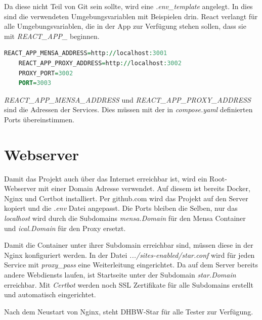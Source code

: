 Da diese nicht Teil von Git sein sollte, wird eine \emph{.env\_template} angelegt. In dies sind die verwendeten Umgebungsvariablen mit Beispielen drin.
React verlangt für alle Umgebungsvariablen, die in der App zur Verfügung stehen sollen, dass sie mit \emph{REACT\_APP\_} beginnen.

\begin{lstlisting}[language=vhdl,
	frame=single,           % Ein Rahmen um den Code
	framexleftmargin=15pt,  % Rahmen link von den Zahlen
	style=algoBericht,
	label={Dockerfile},
	captionpos=b           % Caption unter den Code setzen
	caption={.env für DHBW-Star}]
	REACT_APP_MENSA_ADDRESS=http://localhost:3001 
	REACT_APP_PROXY_ADDRESS=http://localhost:3002
	PROXY_PORT=3002
	PORT=3003
\end{lstlisting}

\emph{REACT\_APP\_MENSA\_ADDRESS} und \emph{REACT\_APP\_PROXY\_ADDRESS} sind die Adressen der Services. Dies müssen mit der in \emph{compose.yaml} definierten Ports übereinstimmen. 

\section{Webserver}
Damit das Projekt auch über das Internet erreichbar ist, wird ein Root-Webserver mit einer Domain Adresse verwendet. Auf diesem ist bereits Docker, Nginx und Certbot installiert.
Per github.com wird das Projekt auf den Server kopiert und die \emph{.env} Datei angepasst. Die Ports bleiben die Selben, nur das \emph{localhost} wird durch die Subdomains \emph{mensa.Domain} für den Mensa Container und \emph{ical.Domain} für den Proxy ersetzt.

Damit die Container unter ihrer Subdomain erreichbar sind, müssen diese in der Nginx konfiguriert werden. In der Datei \emph{.../sites-enabled/star.conf} wird für jeden Service mit \emph{proxy\_pass} eine Weiterleitung eingerichtet.
Da auf dem Server bereits andere Webdiensts laufen, ist Startseite unter der Subdomain \emph{star.Domain} erreichbar. Mit \emph{Certbot} werden noch SSL Zertifikate für alle Subdomains erstellt und automatisch eingerichtet.

Nach dem Neustart von Nginx, steht DHBW-Star für alle Tester zur Verfügung.

